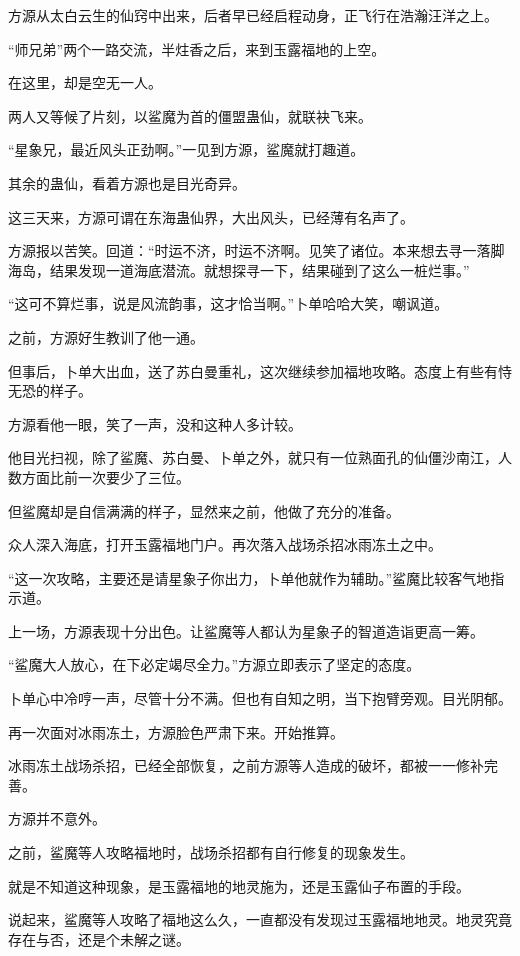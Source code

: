 \begin{this_body}
方源从太白云生的仙窍中出来，后者早已经启程动身，正飞行在浩瀚汪洋之上。

“师兄弟”两个一路交流，半炷香之后，来到玉露福地的上空。

在这里，却是空无一人。

两人又等候了片刻，以鲨魔为首的僵盟蛊仙，就联袂飞来。

“星象兄，最近风头正劲啊。”一见到方源，鲨魔就打趣道。

其余的蛊仙，看着方源也是目光奇异。

这三天来，方源可谓在东海蛊仙界，大出风头，已经薄有名声了。

方源报以苦笑。回道：“时运不济，时运不济啊。见笑了诸位。本来想去寻一落脚海岛，结果发现一道海底潜流。就想探寻一下，结果碰到了这么一桩烂事。”

“这可不算烂事，说是风流韵事，这才恰当啊。”卜单哈哈大笑，嘲讽道。

之前，方源好生教训了他一通。

但事后，卜单大出血，送了苏白曼重礼，这次继续参加福地攻略。态度上有些有恃无恐的样子。

方源看他一眼，笑了一声，没和这种人多计较。

他目光扫视，除了鲨魔、苏白曼、卜单之外，就只有一位熟面孔的仙僵沙南江，人数方面比前一次要少了三位。

但鲨魔却是自信满满的样子，显然来之前，他做了充分的准备。

众人深入海底，打开玉露福地门户。再次落入战场杀招冰雨冻土之中。

“这一次攻略，主要还是请星象子你出力，卜单他就作为辅助。”鲨魔比较客气地指示道。

上一场，方源表现十分出色。让鲨魔等人都认为星象子的智道造诣更高一筹。

“鲨魔大人放心，在下必定竭尽全力。”方源立即表示了坚定的态度。

卜单心中冷哼一声，尽管十分不满。但也有自知之明，当下抱臂旁观。目光阴郁。

再一次面对冰雨冻土，方源脸色严肃下来。开始推算。

冰雨冻土战场杀招，已经全部恢复，之前方源等人造成的破坏，都被一一修补完善。

方源并不意外。

之前，鲨魔等人攻略福地时，战场杀招都有自行修复的现象发生。

就是不知道这种现象，是玉露福地的地灵施为，还是玉露仙子布置的手段。

说起来，鲨魔等人攻略了福地这么久，一直都没有发现过玉露福地地灵。地灵究竟存在与否，还是个未解之谜。


\end{this_body}
